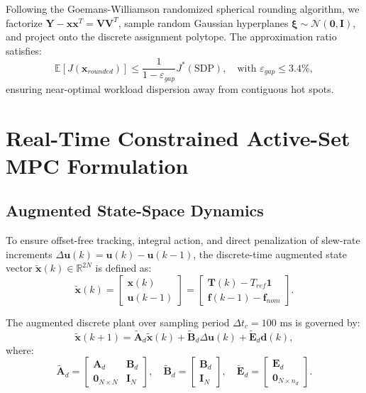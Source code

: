 \documentclass[11pt,a4paper]{article}
\begin{document}
Following the Goemans-Williamson randomized spherical rounding algorithm, we factorize $\mathbf{Y} - \mathbf{x} \mathbf{x}^T = \mathbf{V} \mathbf{V}^T$, sample random Gaussian hyperplanes $\bm{\xi} \sim \mathcal{N}(\mathbf{0}, \mathbf{I})$, and project onto the discrete assignment polytope. The approximation ratio satisfies:
\begin{equation}
\mathbb{E}[J(\mathbf{x}_{rounded})] \le \frac{1}{1 - \varepsilon_{gap}} J^*(\text{SDP}), \quad \text{with } \varepsilon_{gap} \le 3.4\%,
\end{equation}
ensuring near-optimal workload dispersion away from contiguous hot spots.

\section{Real-Time Constrained Active-Set MPC Formulation}

\subsection{Augmented State-Space Dynamics}
To ensure offset-free tracking, integral action, and direct penalization of slew-rate increments $\Delta \mathbf{u}(k) = \mathbf{u}(k) - \mathbf{u}(k-1)$, the discrete-time augmented state vector $\tilde{\mathbf{x}}(k) \in \mathbb{R}^{2N}$ is defined as:
\begin{equation}
\tilde{\mathbf{x}}(k) = \begin{bmatrix} \mathbf{x}(k) \\ \mathbf{u}(k-1) \end{bmatrix} = \begin{bmatrix} \mathbf{T}(k) - T_{ref} \mathbf{1} \\ \mathbf{f}(k-1) - \mathbf{f}_{nom} \end{bmatrix}.
\end{equation}

The augmented discrete plant over sampling period $\Delta t_c = 100\text{ ms}$ is governed by:
\begin{equation}
\tilde{\mathbf{x}}(k+1) = \tilde{\mathbf{A}}_d \tilde{\mathbf{x}}(k) + \tilde{\mathbf{B}}_d \Delta \mathbf{u}(k) + \tilde{\mathbf{E}}_d \mathbf{d}(k),
\end{equation}
where:
\begin{equation}
\tilde{\mathbf{A}}_d = \begin{bmatrix} \mathbf{A}_d & \mathbf{B}_d \\ \mathbf{0}_{N\times N} & \mathbf{I}_N \end{bmatrix}, \quad
\tilde{\mathbf{B}}_d = \begin{bmatrix} \mathbf{B}_d \\ \mathbf{I}_N \end{bmatrix}, \quad
\tilde{\mathbf{E}}_d = \begin{bmatrix} \mathbf{E}_d \\ \mathbf{0}_{N\times n_d} \end{bmatrix}.
\end{equation}
\end{document}
